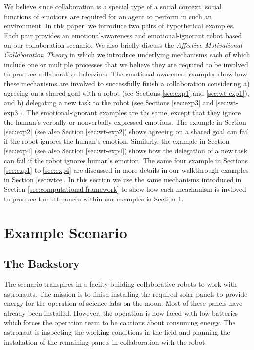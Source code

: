 We believe since collaboration is a special type of a social context, social
functions of emotions are required for an agent to perform in such an
environment. In this paper, we introduce two pairs of hypothetical examples.
Each pair provides an emotional-awareness and emotional-ignorant robot based on
our collaboration scenario. We also briefly discuss the \textit{Affective
Motivational Collaboration Theory} in which we introduce underlying mechanisms
each of which include one or multiple processes that we believe they are
required to be involved to produce collaborative behaviors. The
emotional-awareness examples show how these mechanisms are involved to
successfully finish a collaboration considering a) agreeing on a shared goal
with a robot (see Sections \ref{sec:exp1} and \ref{sec:wt-exp1}), and b)
delegating a new task to the robot (see Sections \ref{sec:exp3} and
\ref{sec:wt-exp3}). The emotional-ignorant examples are the same, except that
they ignore the human's verbally or nonverbally expressed emotions. The example
in Section \ref{sec:exp2} (see also Section \ref{sec:wt-exp2}) shows agreeing on
a shared goal can fail if the robot ignores the human's emotion. Similarly, the
example in Section \ref{sec:exp4} (see also Section \ref{sec:wt-exp4}) shows how
the delegation of a new task can fail if the robot ignores human's emotion. The
same four example in Sections \ref{sec:exp1} to \ref{sec:exp4} are discussed
in more details in our walkthrough examples in Section \ref{sec:wtce}. In this
section we use the same mechanisms introduced in Section
\ref{sec:computational-framework} to show how each meachanism is invloved to
produce the utterances within our examples in Section
\ref{sec:example-scenario}.

\section{Example Scenario}
\label{sec:example-scenario}

\subsection{The Backstory}

The scenario transpires in a facilty building collaborative robots to work with
astronauts. The mission is to finish installing the required solar panels to
provide energy for the operation of science labs on the moon. Most of these
panels have already been installed. However, the operation is now faced with low
batteries which forces the operation team to be cautious about consuming energy.
The astronaut is inspecting the working conditions in the field and planning the
installation of the remaining panels in collaboration with the robot.

